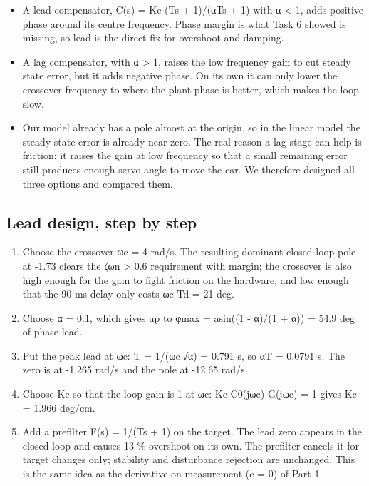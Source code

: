 \documentclass[11pt,a4paper]{article}
\providecommand{\tightlist}{\setlength{\itemsep}{0pt}\setlength{\parskip}{0pt}}
\begin{document}
\begin{itemize}
\tightlist
\item
  A lead compensator, C(s) = Kc (Ts + 1)/(αTs + 1) with α \textless{} 1,
  adds positive phase around its centre frequency. Phase margin is what
  Task 6 showed is missing, so lead is the direct fix for overshoot and
  damping.
\item
  A lag compensator, with α \textgreater{} 1, raises the low frequency
  gain to cut steady state error, but it adds negative phase. On its own
  it can only lower the crossover frequency to where the plant phase is
  better, which makes the loop slow.
\item
  Our model already has a pole almost at the origin, so in the linear
  model the steady state error is already near zero. The real reason a
  lag stage can help is friction: it raises the gain at low frequency so
  that a small remaining error still produces enough servo angle to move
  the car. We therefore designed all three options and compared them.
\end{itemize}

\hypertarget{lead-design-step-by-step}{%
\subsection{Lead design, step by step}\label{lead-design-step-by-step}}

\begin{enumerate}
\def\labelenumi{\arabic{enumi}.}
\tightlist
\item
  Choose the crossover ωc = 4 rad/s. The resulting dominant closed loop pole at -1.73 clears the ζωn \textgreater{} 0.6 requirement with margin; the crossover is also high enough for the gain to fight friction
  on the hardware, and low enough that the 90 ms delay only costs ωc Td
  = 21 deg.
\item
  Choose α = 0.1, which gives up to φmax = asin((1 - α)/(1 + α)) = 54.9
  deg of phase lead.
\item
  Put the peak lead at ωc: T = 1/(ωc √α) = 0.791 s, so αT = 0.0791 s.
  The zero is at -1.265 rad/s and the pole at -12.65 rad/s.
\item
  Choose Kc so that the loop gain is 1 at ωc: \textbar Kc C0(jωc)
  G(jωc)\textbar{} = 1 gives Kc = 1.966 deg/cm.
\item
  Add a prefilter F(s) = 1/(Ts + 1) on the target. The lead zero appears
  in the closed loop and causes 13 \% overshoot on its own. The
  prefilter cancels it for target changes only; stability and
  disturbance rejection are unchanged. This is the same idea as the
  derivative on measurement (c = 0) of Part 1.
\end{enumerate}
\end{document}
